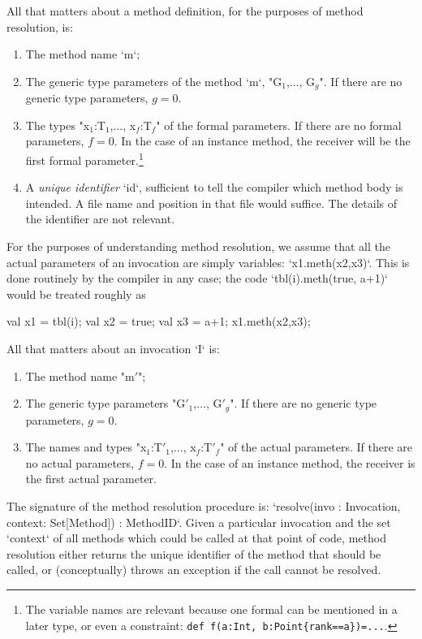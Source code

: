 All that matters about a method definition, for the purposes of method
resolution, is: 
\begin{enumerate}
\item The method name \xcd`m`;
\item The generic type parameters of the method \xcd`m`,  \xcdmath"G$_1$,$\ldots$, G$_g$".  If there
      are no generic type parameters, {$g=0$}.  
\item The types \xcdmath"x$_1$:T$_1$,$\ldots$, x$_f$:T$_f$" of the formal parameters.  If
      there are no formal parameters, {$f=0$}. In the case of an instance
      method, the receiver will be the first formal parameter.\footnote{The
      variable names are relevant because one formal can be mentioned in a
      later type, or even a constraint: {\tt def f(a:Int, b:Point\{rank==a\})=...}.}
\item A {\em unique identifier} \xcd`id`, sufficient to tell the compiler
      which method body is intended.  A file name and position in that file
      would suffice.  The details of the identifier are not relevant.
\end{enumerate}

For the purposes of understanding method resolution, we assume that all the
actual parameters of an invocation are simply variables: \xcd`x1.meth(x2,x3)`.
This is done routinely by the compiler in any case; the code 
\xcd`tbl(i).meth(true, a+1)` would be treated roughly as 
\begin{xten}
val x1 = tbl(i);
val x2 = true;
val x3 = a+1;
x1.meth(x2,x3);
\end{xten}

All that matters about an invocation \xcd`I` is: 
\begin{enumerate}
\item The method name \xcdmath"m$'$";
\item The generic type parameters \xcdmath"G$'_1$,$\ldots$, G$'_g$".  If there
      are no generic type parameters, {$g=0$}.  
\item The names and types \xcdmath"x$_1$:T$'_1$,$\ldots$, x$_f$:T$'_f$" of the
      actual parameters.
      If
      there are no actual parameters, {$f=0$}. In the case of an instance
      method, the receiver is the first actual parameter.
\end{enumerate}

The signature of the method resolution procedure is: 
\xcd`resolve(invo : Invocation, context: Set[Method]) : MethodID`.  
Given a particular invocation and the set \xcd`context` of all methods
which could be called at that point of code, method resolution either returns
the unique identifier of the method that should be called, or (conceptually)
throws an exception if the call cannot be resolved.


